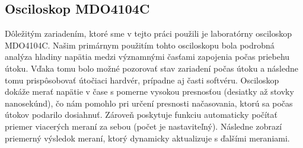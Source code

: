 \subsection{Osciloskop MDO4104C}
Dôležitým zariadením, ktoré sme v tejto práci použili je laboratórny osciloskop MDO4104C. Našim primárnym použitím tohto osciloskopu bola podrobná analýza hladiny napätia medzi významnými časťami zapojenia počas priebehu útoku. Vďaka tomu bolo možné pozorovať stav zariadení počas útoku a následne tomu prispôsobovať útočiaci hardvér, prípadne aj časti softvéru. Osciloskop dokáže merať napätie v čase s pomerne vysokou presnosťou (desiatky až stovky nanosekúnd), čo nám pomohlo pri určení presnosti načasovania, ktorú sa počas útokov podarilo dosiahnuť. Zároveň poskytuje funkciu automaticky počítať priemer viacerých meraní za sebou (počet je nastaviteľný). Následne zobrazí priemerný výsledok meraní, ktorý dynamicky aktualizuje s ďalšími meraniami.

